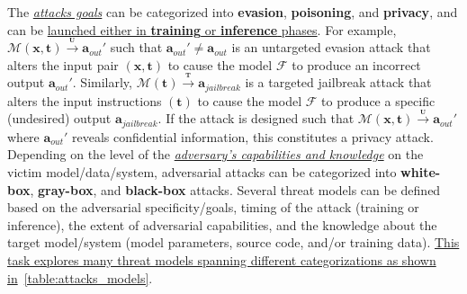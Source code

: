 The \ul{\emph{attacks goals}} can be categorized into \textbf{evasion}, \textbf{poisoning}, and \textbf{privacy}, and can be \ul{launched either in \textbf{training} or \textbf{inference} phases}.
For example, $\mathcal{M}(\bm{x},\bm{t}) \xrightarrow{{}_{\textbf{U}}} \bm{a}_{out}'$ such that $\bm{a}_{out}' \neq \bm{a}_{out}$ is an untargeted evasion attack that alters the input pair $(\bm{x},\bm{t})$ to cause the model $\mathcal{F}$ to produce an incorrect output $\bm{a}_{out}'$.
Similarly, $\mathcal{M}(\bm{t}) \xrightarrow{{}_{\textbf{T}}} \bm{a}_{jailbreak}$ is a targeted jailbreak attack that alters the input instructions $(\bm{t})$ to cause the model $\mathcal{F}$ to produce a specific (undesired) output $\bm{a}_{jailbreak}$.
If the attack is designed such that $\mathcal{M}(\bm{x},\bm{t}) \xrightarrow{{}_{\textbf{U}}} \bm{a}_{out}'$ where $\bm{a}_{out}'$ reveals confidential information, this constitutes a privacy attack.
Depending on the level of the \ul{\emph{adversary's capabilities and knowledge}} on the victim model/data/system, adversarial attacks can be categorized into \textbf{white-box}, \textbf{gray-box}, and \textbf{black-box} attacks. 
Several threat models can be defined based on the adversarial specificity/goals, timing of the attack (\eg training or inference), the extent of adversarial capabilities, and the knowledge about the target model/system (\eg model parameters, source code, and/or training data).
\ul{This task explores many threat models spanning different categorizations as shown in}{~\autoref{table:attacks_models}}.





